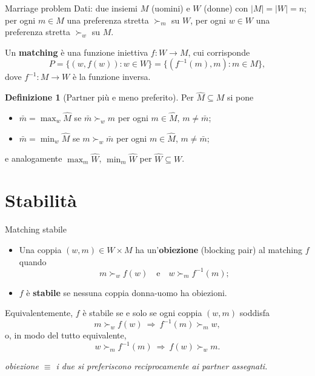 \documentclass[12pt,a4paper,twoside]{book}
\theoremstyle{plain}
\theoremstyle{definition}
\newtheorem{definition}[theorem]{Definizione}
\begin{document}
\begin{defbox}{Marriage problem}
Dati: due insiemi $M$ (uomini) e $W$ (donne) con $|M|=|W|=n$; per ogni $m\in M$ una preferenza stretta $\succ_m$ su $W$, per ogni $w\in W$ una preferenza stretta $\succ_w$ su $M$.

Un \textbf{matching} è una funzione iniettiva $f:W\to M$, cui corrisponde
\[ P=\bigl\{(w,f(w)) : w\in W\bigr\}=\bigl\{(f^{-1}(m),m) : m\in M\bigr\}, \]
dove $f^{-1}:M\to W$ è la funzione inversa.
\end{defbox}

\begin{definition}[Partner più e meno preferito]
Per $\hat M\subseteq M$ si pone
\begin{itemize}
  \item[(i)] $\bar m=\max_w \hat M$ se $\bar m\succ_w m$ per ogni $m\in\hat M$, $m \neq \bar m$;
  \item[(ii)] $\bar m=\min_w \hat M$ se $m\succ_w \bar m$ per ogni $m\in\hat M$, $m \neq \bar m$;
\end{itemize}
e analogamente $\max_m \hat W$, $\min_m \hat W$ per $\hat W\subseteq W$.
\end{definition}

\section{Stabilità}

\begin{defbox}{Matching stabile}
\begin{itemize}
  \item[(i)] Una coppia $(w,m)\in W\times M$ ha un'\textbf{obiezione} (blocking pair) al matching $f$ quando
  \[ m\succ_w f(w)\quad\text{e}\quad w\succ_m f^{-1}(m); \]
  \item[(ii)] $f$ è \textbf{stabile} se nessuna coppia donna-uomo ha obiezioni.
\end{itemize}
Equivalentemente, $f$ è stabile se e solo se ogni coppia $(w,m)$ soddisfa
\[ m\succ_w f(w)\ \Longrightarrow\ f^{-1}(m)\succ_m w, \]
o, in modo del tutto equivalente,
\[ w\succ_m f^{-1}(m)\ \Longrightarrow\ f(w)\succ_w m. \]
\end{defbox}

\begin{center}\itshape
obiezione $\equiv$ i due si preferiscono reciprocamente ai partner assegnati.
\end{center}
\end{document}
